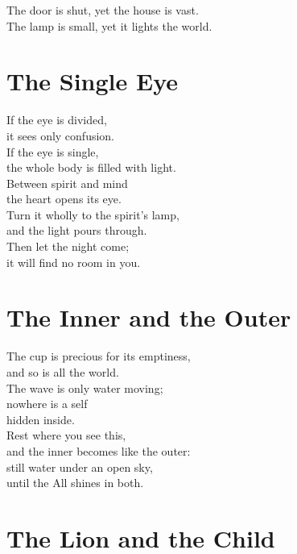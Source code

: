 \documentclass[10pt, openright]{book}
\newcommand{\sectionbreak}{\filbreak}
\newcommand{\sayingsource}[1]{\par\nopagebreak\vspace{0.3\baselineskip}{\raggedleft\footnotesize\itshape #1\par}}
\begin{document}
\begin{center}
The door is shut, yet the house is vast.\\
The lamp is small, yet it lights the world.
\end{center}

\sectionbreak

\section{The Single Eye}\label{the-single-eye}

If the eye is divided,\\
it sees only confusion.\\
If the eye is single,\\
the whole body is filled with light.\\
Between spirit and mind\\
the heart opens its eye.\\
Turn it wholly to the spirit's lamp,\\
and the light pours through.\\
Then let the night come;\\
it will find no room in you.

\sayingsource{Tao Te Ching 10 · Matthew 6:22 · Mary 10 · Dialogue of the
Savior}

\sectionbreak

\section{The Inner and the Outer}\label{the-inner-and-the-outer}

The cup is precious for its emptiness,\\
and so is all the world.\\
The wave is only water moving;\\
nowhere is a self\\
hidden inside.\\
Rest where you see this,\\
and the inner becomes like the outer:\\
still water under an open sky,\\
until the All shines in both.

\sayingsource{Tao Te Ching 11 · Thomas 22, 89}

\sectionbreak

\section{The Lion and the Child}\label{the-lion-and-the-child}
\end{document}
